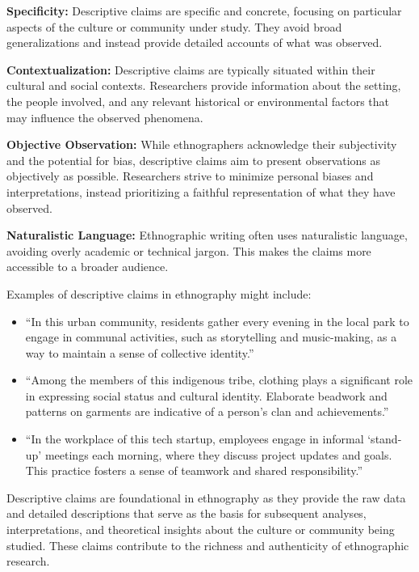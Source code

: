 \documentclass[
  b5paper]{book}
\begin{document}
\textbf{Specificity:} Descriptive claims are specific and concrete, focusing on particular aspects of the culture or community under study. They avoid broad generalizations and instead provide detailed accounts of what was observed.

\textbf{Contextualization:} Descriptive claims are typically situated within their cultural and social contexts. Researchers provide information about the setting, the people involved, and any relevant historical or environmental factors that may influence the observed phenomena.

\textbf{Objective Observation:} While ethnographers acknowledge their subjectivity and the potential for bias, descriptive claims aim to present observations as objectively as possible. Researchers strive to minimize personal biases and interpretations, instead prioritizing a faithful representation of what they have observed.

\textbf{Naturalistic Language:} Ethnographic writing often uses naturalistic language, avoiding overly academic or technical jargon. This makes the claims more accessible to a broader audience.

Examples of descriptive claims in ethnography might include:

\begin{itemize}
\item
  ``In this urban community, residents gather every evening in the local park to engage in communal activities, such as storytelling and music-making, as a way to maintain a sense of collective identity.''
\item
  ``Among the members of this indigenous tribe, clothing plays a significant role in expressing social status and cultural identity. Elaborate beadwork and patterns on garments are indicative of a person's clan and achievements.''
\item
  ``In the workplace of this tech startup, employees engage in informal `stand-up' meetings each morning, where they discuss project updates and goals. This practice fosters a sense of teamwork and shared responsibility.''
\end{itemize}

Descriptive claims are foundational in ethnography as they provide the raw data and detailed descriptions that serve as the basis for subsequent analyses, interpretations, and theoretical insights about the culture or community being studied. These claims contribute to the richness and authenticity of ethnographic research.
\end{document}
